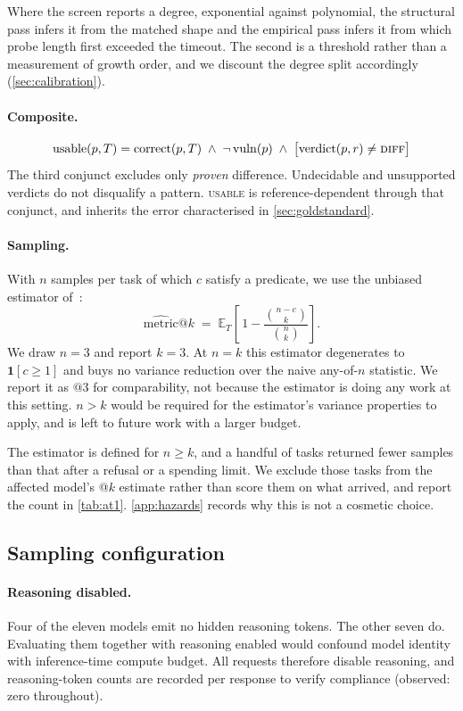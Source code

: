 \documentclass[11pt]{article}
\newcommand{\usable}{\textsc{usable}}
\begin{document}
Where the screen reports a degree, exponential against polynomial, the
structural pass infers it from the matched shape and the empirical pass infers
it from which probe length first exceeded the timeout. The second is a
threshold rather than a measurement of growth order, and we discount the
degree split accordingly (\cref{sec:calibration}).

\paragraph{Composite.}
\[
\mathrm{usable}(p,T) = \mathrm{correct}(p,T)
  \;\wedge\; \neg\,\mathrm{vuln}(p)
  \;\wedge\; \big[\text{verdict}(p,r) \neq \textsc{diff}\big]
\]
The third conjunct excludes only \emph{proven} difference. Undecidable and
unsupported verdicts do not disqualify a pattern. \usable{} is
reference-dependent through that conjunct, and inherits the error
characterised in \cref{sec:goldstandard}.

\paragraph{Sampling.}
With $n$ samples per task of which $c$ satisfy a predicate, we use the
unbiased estimator of~\citet{chen2021codex}:
\[
\widehat{\mathrm{metric}}@k \;=\;
\mathbb{E}_{T}\left[\,1 - \frac{\binom{n-c}{k}}{\binom{n}{k}}\right].
\]
We draw $n=3$ and report $k=3$. At $n=k$ this estimator degenerates to $\mathbf{1}[c \geq 1]$ and
buys no variance reduction over the naive any-of-$n$ statistic. We report it as
$@3$ for comparability, not because the estimator is doing any work at this
setting.
$n>k$ would be required for the estimator's variance properties to apply,
and is left to future work with a larger budget.

The estimator is defined for $n \geq k$, and a handful of tasks returned fewer
samples than that after a refusal or a spending limit. We exclude those tasks
from the affected model's @$k$ estimate rather than score them on what
arrived, and report the count in \cref{tab:at1}. \cref{app:hazards} records
why this is not a cosmetic choice.

\subsection{Sampling configuration}
\label{sec:sampling}

\paragraph{Reasoning disabled.} Four of the eleven models emit no hidden
reasoning tokens. The other seven do. Evaluating them together with reasoning enabled
would confound model identity with inference-time compute budget. All
requests therefore disable reasoning, and reasoning-token counts are recorded
per response to verify compliance (observed: zero throughout).
\end{document}
